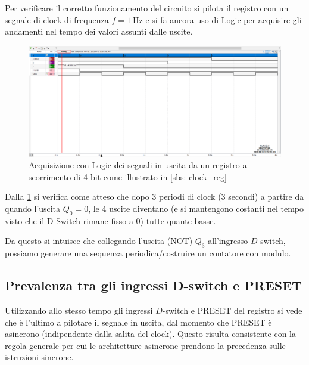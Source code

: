 \documentclass[10pt, a4paper, italian]{article}
\begin{document}
Per verificare il corretto funzionamento del circuito si pilota il registro
con un segnale di clock di frequenza $f = \SI{1}{\Hz}$ e si fa ancora uso di
Logic per acquisire gli andamenti nel tempo dei valori assunti dalle uscite.
\begin{figure}[htbp]
\centering
	\includegraphics[width=\textwidth]{3.c}
	\caption{Acquisizione con Logic dei segnali in uscita da un registro a
	scorrimento di 4 bit come illustrato in \cref{sbs: clock_reg}
	\label{fig: Shift_reg_clock}}
\end{figure}
Dalla \cref{fig: Shift_reg_clock} si verifica come atteso che dopo 3 periodi
di clock (3 secondi) a partire da quando l'uscita $Q_0 = 0$, le 4 uscite
diventano (e si mantengono costanti nel tempo visto che il D-Switch rimane
fisso a 0) tutte quante basse.

Da questo si intuisce che collegando l'uscita (NOT) $Q_3$ all'ingresso
$D$-switch, possiamo generare una sequenza periodica/costruire un contatore
con modulo.

\subsection{Prevalenza tra gli ingressi D-switch e PRESET}
Utilizzando allo stesso tempo gli ingressi $D$-switch e PRESET del registro
si vede che è l'ultimo a pilotare il segnale in uscita, dal momento che PRESET
è asincrono (indipendente dalla salita del clock). Questo risulta consistente
con la regola generale per cui le architetture asincrone prendono la precedenza
sulle istruzioni sincrone. 
\end{document}

